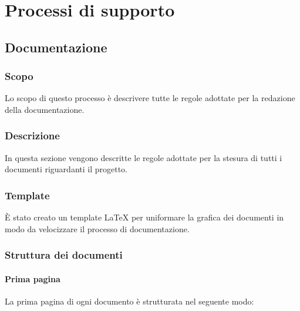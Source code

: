\documentclass[../NormediProgetto.tex]{subfiles}
\begin{document}
\chapter{Processi di supporto}

\section{Documentazione}

\subsection{Scopo} 

Lo scopo di questo processo è descrivere tutte le regole adottate per la redazione della documentazione. 
	
\subsection{Descrizione}

In questa sezione vengono descritte le regole adottate per la stesura di tutti i documenti riguardanti il progetto.

\subsection{Template}

È stato creato un template \LaTeX{} per uniformare la grafica dei documenti in modo da velocizzare il processo di documentazione.

\subsection{Struttura dei documenti}

\subsubsection{Prima pagina}

La prima pagina di ogni documento è strutturata nel seguente modo:
\end{document}
